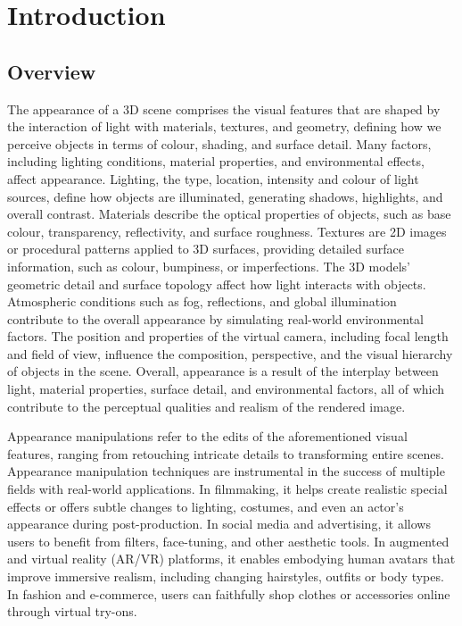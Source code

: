 \chapter{Introduction}






\section{Overview} 

The appearance of a 3D scene comprises the visual features that are shaped by the interaction of light with materials, textures, and geometry, defining how we perceive objects in terms of colour, shading, and surface detail. Many factors, including lighting conditions, material properties, and environmental effects, affect appearance. Lighting, the type, location, intensity and colour of light sources, define how objects are illuminated, generating shadows, highlights, and overall contrast. Materials describe the optical properties of objects, such as base colour, transparency, reflectivity, and surface roughness. Textures are 2D images or procedural patterns applied to 3D surfaces, providing detailed surface information, such as colour, bumpiness, or imperfections. The 3D models' geometric detail and surface topology affect how light interacts with objects. Atmospheric conditions such as fog, reflections, and global illumination contribute to the overall appearance by simulating real-world environmental factors. The position and properties of the virtual camera, including focal length and field of view, influence the composition, perspective, and the visual hierarchy of objects in the scene. Overall, appearance is a result of the interplay between light, material properties, surface detail, and environmental factors, all of which contribute to the perceptual qualities and realism of the rendered image.

Appearance manipulations refer to the edits of the aforementioned visual features, ranging from retouching intricate details to transforming entire scenes. Appearance manipulation techniques are instrumental in the success of multiple fields with real-world applications. In filmmaking, it helps create realistic special effects or offers subtle changes to lighting, costumes, and even an actor’s appearance during post-production. In social media and advertising, it allows users to benefit from filters, face-tuning, and other aesthetic tools. In augmented and virtual reality (AR/VR) platforms, it enables embodying human avatars that improve immersive realism, including changing hairstyles, outfits or body types. In fashion and e-commerce, users can faithfully shop clothes or accessories online through virtual try-ons. 


